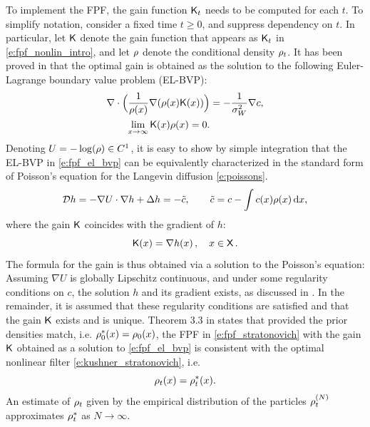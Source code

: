 To implement the FPF, the gain function $\text{\sf K}_t$ needs to be computed for each $t$. To simplify notation, consider a fixed time $t\ge 0$,  and suppress dependency on $t$.  In particular, let $\text{\sf K}$ denote the gain function that appears as  $ \text{\sf K}_t$  in \eqref{e:fpf_nonlin_intro},  and let $\rho$ denote the conditional density $\rho_t$. It has been proved in \cite{yanmehmey13} that the optimal gain is obtained as the solution to the following Euler-Lagrange boundary value problem (EL-BVP):
\begin{equation}
\begin{aligned}
\nabla \cdot \Bigl(\frac{1}{\pr(x)} \nabla (\pr(x) \kFPF(x))\Bigr) &= - \frac{1}{\sigma^2_W} \nabla c, \\
\lim_{x \to \infty} \kFPF(x) \pr(x) = 0.
\label{e:fpf_el_bvp}
\end{aligned}
\end{equation}%
Denoting $U=-\log(\rho)\in C^1$, it is easy to show by simple integration that the EL-BVP in \eqref{e:fpf_el_bvp} can be equivalently characterized in the standard form of Poisson's equation for the Langevin diffusion \eqref{e:poissons}.
\begin{equation}
\generate h = -\nabla \pot \cdot \nabla h + \Delta h  = -\tilc, \qquad \tilc = c - \int c(x) \pr(x)\, \ud x, 
\label{e:fpf_poissons}
\end{equation}
where the gain $\text{\sf K}$ coincides with the gradient of $h$:
\begin{equation}
\kFPF (x) = \nabla h(x)\, ,  \quad x\in\state\, .
\label{e:fpf_k_gradient}
\end{equation}
The formula for the gain is thus obtained via a solution to the Poisson's equation:
Assuming $\nabla U$ is globally Lipschitz continuous, and under some regularity conditions on $c$, the solution $h$ and its gradient exists, as discussed in . In the remainder, it is assumed that these regularity conditions are satisfied and that the gain $\text{\sf K}$ exists and is unique. Theorem 3.3 in \cite{yanmehmey13} states that provided the prior densities match, i.e. $\rho^*_0(x) = \rho_0(x)$, the FPF in \eqref{e:fpf_stratonovich} with the gain $\text{\sf K}$ obtained as a solution to \eqref{e:fpf_el_bvp} is consistent with the optimal nonlinear filter \eqref{e:kushner_stratonovich}, i.e.
\begin{equation}
\rho_t(x) = \rho^*_t(x). 
\end{equation}
An estimate of $\rho_t$ given by the empirical distribution of the particles $\rho^{(N)}_t$ approximates $\rho^*_t$ as $N \to \infty$. 
